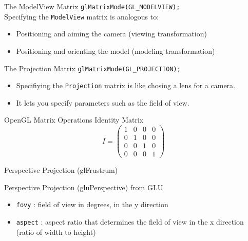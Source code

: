 \documentclass[xcolor=dvipsnames,t]{beamer}
\newcommand{\showcode}[1]{\begin{mdframed}[style=code] %
                          \end{mdframed}%
}
\begin{document}
\begin{frame}{The ModelView Matrix}
    \texttt{glMatrixMode(GL\_MODELVIEW);} \\[1cm]
    Specifying the \texttt{ModelView} matrix is analogous to:
    \begin{itemize} 
        \item Positioning and aiming the camera (viewing transformation)
        \item Positioning and orienting the model (modeling transformation)
    \end{itemize} 
\end{frame} 

\begin{frame}{The Projection Matrix}
\texttt{glMatrixMode(GL\_PROJECTION);} \\[1cm]
    \begin{itemize} 
        \item Specifiying the \texttt{Projection} matrix is like chosing a lens for a camera.
        \item It lets you specify parameters such as the field of view.
    \end{itemize} 
\end{frame} 

\begin{frame}{OpenGL Matrix Operations} 
    Identity Matrix
    \begin{equation*}
    I = \left(
                \begin{array}{cccc}
                    1   & 0     & 0     & 0     \\
                    0   & 1     & 0     & 0     \\
                    0   & 0     & 1     & 0     \\
                    0   & 0     & 0     & 1
                \end{array} 
            \right)
    \end{equation*} 
    \showcode{matrixops.c} 
\end{frame} 

\begin{frame}{Perspective Projection (glFrustrum)}
    \showcode{frustrum.c} 
\end{frame} 

\begin{frame}{Perspective Projection (gluPerspective) from GLU} 
    \showcode{perspective.c} 
    \begin{itemize} 
        \item \texttt{fovy} : field of view in degrees, in the y direction
        \item \texttt{aspect} : aspect ratio that determines the field of view in
          the x direction (ratio of width to height)
    \end{itemize} 
\end{frame} 
\end{document}
